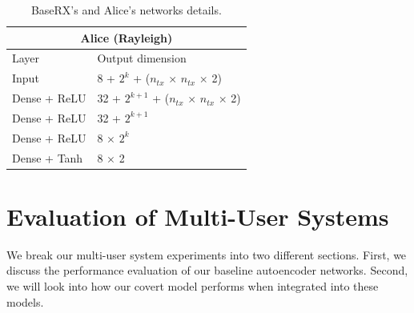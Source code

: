 \begin{table}[bp!]
\begin{adjustbox}{width=0.9\columnwidth,center}
\begin{tabular}{|l|l|}
			\hline
			\multicolumn{2}{|c|}{\textbf{Alice (Rayleigh)}} 															\\
			\hline
			Layer 																	&	Output dimension	\\
			\hline
			Input   											& 8 + $2^k$ + (\(n_{tx}\) $\times$ \(n_{tx}\) $\times$ 2)    	 		    \\ 
			Dense + ReLU          													&	32 + $2^{k+1}$ + (\(n_{tx}\) $\times$ \(n_{tx}\) $\times$ 2)	\\
			Dense + ReLU          													&	32 + $2^{k+1}$	\\
			Dense + ReLU   															&	8 $\times$ $2^k$	\\
			Dense + Tanh																	&	8 $\times$ 2	\\
			\hline
		\end{tabular}
	\end{adjustbox}
	\caption{BaseRX's  and Alice's networks details.}
	\label{table:autoencoder_structure}
\end{table}

\section{Evaluation of Multi-User Systems}
\label{s:multi_eval}
We break our multi-user system experiments into two different sections. First, we discuss the performance evaluation of our baseline autoencoder networks. Second, we will look into how our covert model performs when integrated into these models.



